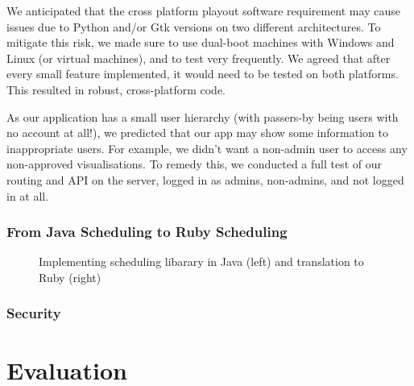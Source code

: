 \documentclass[a4paper, titlepage]{article}
\begin{document}


We anticipated that the cross platform playout software requirement may cause issues due to Python
and/or Gtk versions on two different architectures. To mitigate this risk, we made sure to use dual-boot
machines with Windows and Linux (or virtual machines), and to test very frequently. We agreed that after
every small feature implemented, it would need to be tested on both platforms. This resulted in robust, 
cross-platform code.


As our application has a small user hierarchy (with passers-by being users with no account at all!), we 
predicted that our app may show some information to inappropriate users. For example, we didn't want a 
non-admin user to access any non-approved visualisations. To remedy this, we conducted a full test of
our routing and API on the server, logged in as admins, non-admins, and not logged in at all. 




\subsubsection{From Java Scheduling to Ruby Scheduling}

\begin{figure}[ht]
  \begin{minipage}{0.49\textwidth}
  \end{minipage}
  \begin{minipage}{0.49\textwidth}
  \end{minipage}
    
  \caption{Implementing scheduling libarary in Java (left) and translation to Ruby (right)}
  \label{fig:impl_translation}
\end{figure}


\subsubsection{Security}



\newpage
\section{Evaluation}
\end{document}
